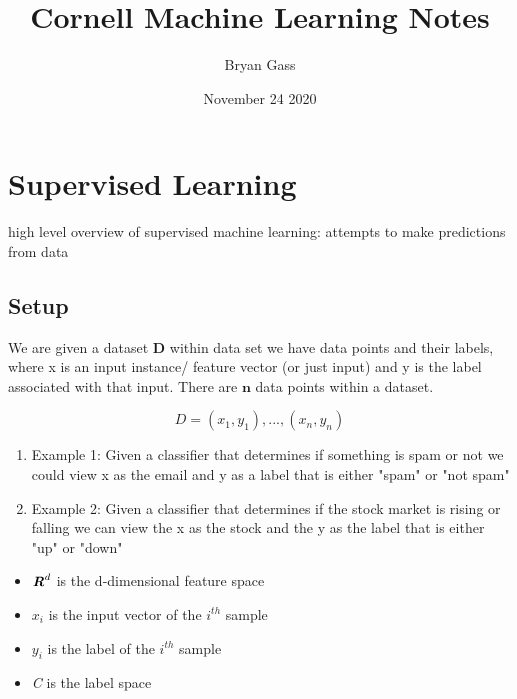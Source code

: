 \documentclass{article}
\title{Cornell Machine Learning Notes}
\author{Bryan Gass}
\date{November 24 2020}
\begin{document}
\maketitle

\tableofcontents
\newpage

\section{Supervised Learning} 
    high level overview of supervised machine learning: attempts to make predictions from data 
    
\subsection{Setup}
    We are given a dataset $\textbf{D}$ within data set we have data points and their labels, where x is an input instance/ feature vector (or just input) and y is the label associated with that input. There are $\textbf{n}$ data points within a dataset. 
    
    \begin{equation}
        D = {(x_1, y_1), ..., (x_n, y_n)}
    \end{equation}
    
    \begin{enumerate}
        \item Example 1: 
            Given a classifier that determines if something is spam or not we could view x as the email and y as a label that is either "spam" or "not spam"
            
        \item Example 2:
            Given a classifier that determines if the stock market is rising or falling we can view the x as the stock and the y as the label that is either "up" or "down"
    \end{enumerate}
    
    \begin{itemize}
        \item 
            $\textbf{\textit{R}}^{d}$ is the d-dimensional feature space
            
        \item
            $x_i$ is the input vector of the $i^{th}$ sample
        
        \item   
            $y_i$ is the label of the $i^{th}$ sample
            
        \item
            \textit{C} is the label space \\
    \end{itemize} 
    
\end{document}
